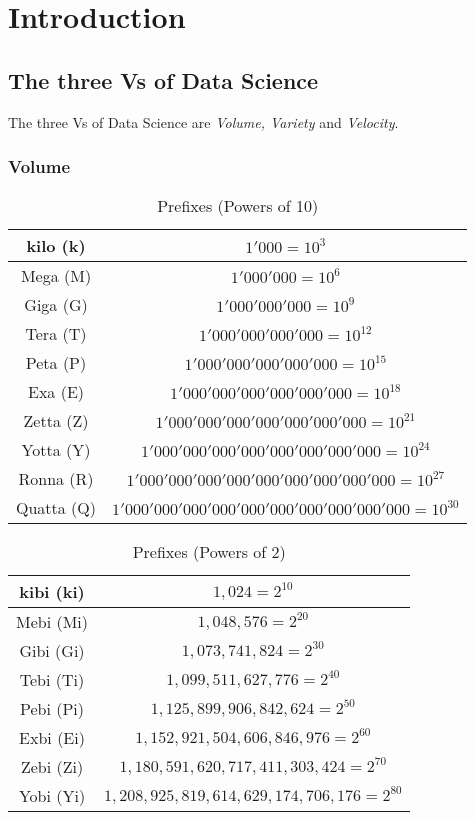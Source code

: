 \section{Introduction}

\subsection{The three Vs of Data Science}

The three Vs of Data Science are \textit{Volume, Variety} and \textit{Velocity}.

\subsubsection{Volume}

\begin{table}[h]
    \centering
    \begin{tabular}[h]{|c|c|}
        \hline
        kilo (k) & $1'000 = 10^3$ \\ \hline
        Mega (M) & $1'000'000 = 10^6$ \\ \hline
        Giga (G) & $1'000'000'000 = 10^9$ \\ \hline
        Tera (T) & $1'000'000'000'000 = 10^{12}$ \\ \hline
        Peta (P) & $1'000'000'000'000'000 = 10^{15}$ \\ \hline
        Exa (E) & $1'000'000'000'000'000'000 = 10^{18}$ \\ \hline
        Zetta (Z) & $1'000'000'000'000'000'000'000 = 10^{21}$ \\ \hline
        Yotta (Y) & $1'000'000'000'000'000'000'000'000 = 10^{24}$ \\ \hline
        Ronna (R) & $1'000'000'000'000'000'000'000'000'000 = 10^{27}$ \\ \hline
        Quatta (Q) & $1'000'000'000'000'000'000'000'000'000'000 = 10^{30}$ \\ \hline
    \end{tabular}
    \caption{Prefixes (Powers of 10)}\label{tab:prefixes10}
\end{table}

\begin{table}[h]
    \centering
    \begin{tabular}[h]{|c|c|}
        \hline
        kibi (ki) & $1,024 = 2^{10}$ \\ \hline
        Mebi (Mi) & $1,048,576 = 2^{20}$ \\ \hline
        Gibi (Gi) & $1,073,741,824 = 2^{30}$ \\ \hline
        Tebi (Ti) & $1,099,511,627,776 = 2^{40}$ \\ \hline
        Pebi (Pi) & $1,125,899,906,842,624 = 2^{50}$ \\ \hline
        Exbi (Ei) & $1,152,921,504,606,846,976 = 2^{60}$ \\ \hline
        Zebi (Zi) & $1,180,591,620,717,411,303,424 = 2^{70}$ \\ \hline
        Yobi (Yi) & $1,208,925,819,614,629,174,706,176 = 2^{80}$ \\ \hline
    \end{tabular}
    \caption{Prefixes (Powers of 2)}\label{tab:prefixes2}
\end{table}

